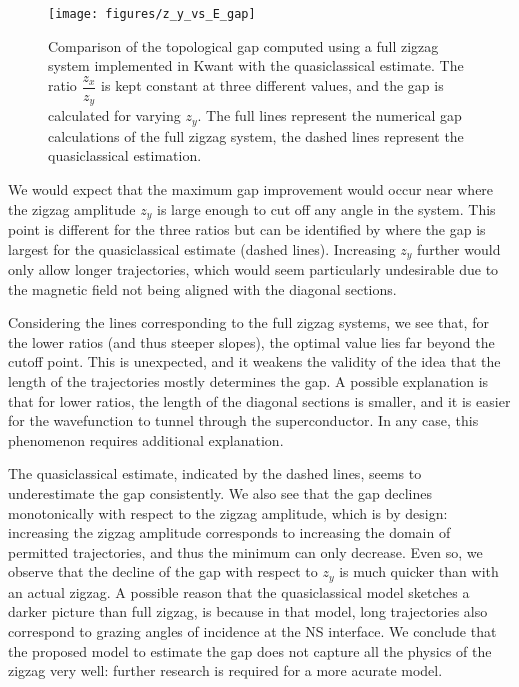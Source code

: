 			\begin{figure}[!htb]
			\centering
			\texttt{[image: figures/z\_y\_vs\_E\_gap]}
			\caption{Comparison of the topological gap computed using a full zigzag system implemented in Kwant with the quasiclassical estimate.
			The ratio $\dfrac{z_x}{z_y}$ is kept constant at three different values, and the gap is calculated for varying $z_y$.
			The full lines represent  the numerical gap calculations of the full zigzag system, the dashed lines represent the quasiclassical estimation.}
			\label{fig:quasiclassical_approximation}
			\end{figure}

			We would expect that the maximum gap improvement would occur near where the zigzag amplitude $z_y$ is large enough to cut off any angle in the system.
			This point is different for the three ratios but can be identified by where the gap is largest for the quasiclassical estimate (dashed lines).
			Increasing $z_y$ further would only allow longer trajectories, which would seem particularly undesirable due to the magnetic field not being aligned with the diagonal sections.

			Considering the lines corresponding to the full zigzag systems, we see that, for the lower ratios (and thus steeper slopes), the optimal value lies far beyond the cutoff point.
			This is unexpected, and it weakens the validity of the idea that the length of the trajectories mostly determines the gap.
			A possible explanation is that for lower ratios, the length of the diagonal sections is smaller, and it is easier for the wavefunction to tunnel through the superconductor.
			In any case, this phenomenon requires additional explanation.

			The quasiclassical estimate, indicated by the dashed lines, seems to underestimate the gap consistently.
			We also see that the gap declines monotonically with respect to the zigzag amplitude, which is by design: increasing the zigzag amplitude corresponds to increasing the domain of permitted trajectories, and thus the minimum can only decrease.
			Even so, we observe that the decline of the gap with respect to $z_y$ is much quicker than with an actual zigzag.
			A possible reason that the quasiclassical model sketches a darker picture than full zigzag, is because in that model, long trajectories also correspond to grazing angles of incidence at the NS interface.
			We conclude that the proposed model to estimate the gap does not capture all the physics of the zigzag very well: further research is required for a more acurate model.

